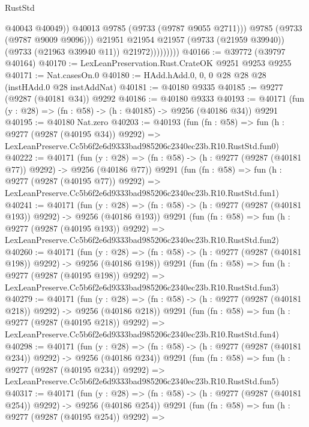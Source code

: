 \begin{lexlean}{RustStd}
\begin{coremodule}
                              @40043
                              @40049))
                          @40013
                          @9785
                          (@9733 (@9787 @9055 @2711)))
                        @9785
                        (@9733 (@9787 @9009 @9096)))
                      @21951
                      @21954
                      @21957
                      (@9733 (@21959 @39940))
                      (@9733 (@21963 @39940 @11))
                      @21972)))))))))
@40166 := @39772 (@39797 @40164)
@40170 := LexLeanPreservation.Rust.CrateOK @9251 @9253 @9255
@40171 := Nat.casesOn.{0}
@40180 := HAdd.hAdd.{0, 0, 0} @28 @28 @28 (instHAdd.{0} @28 instAddNat)
@40181 := @40180 @9335
@40185 := @9277 (@9287 (@40181 @34)) @9292
@40186 := @40180 @9333
@40193 := @40171 (fun (y : @28) => (fn : @58) -> (h : @40185) -> @9256 (@40186 @34)) @9291
@40195 := @40180 Nat.zero
@40203 := @40193
    (fun (fn : @58) =>
    fun (h : @9277 (@9287 (@40195 @34)) @9292) =>
    LexLeanPreserve.Cc5b6f2e6d9333bad985206c2340ec23b.R10.RustStd.fun0)
@40222 := @40171
    (fun (y : @28) => (fn : @58) -> (h : @9277 (@9287 (@40181 @77)) @9292) -> @9256 (@40186 @77))
    @9291
    (fun (fn : @58) =>
    fun (h : @9277 (@9287 (@40195 @77)) @9292) =>
    LexLeanPreserve.Cc5b6f2e6d9333bad985206c2340ec23b.R10.RustStd.fun1)
@40241 := @40171
    (fun (y : @28) => (fn : @58) -> (h : @9277 (@9287 (@40181 @193)) @9292) -> @9256 (@40186 @193))
    @9291
    (fun (fn : @58) =>
    fun (h : @9277 (@9287 (@40195 @193)) @9292) =>
    LexLeanPreserve.Cc5b6f2e6d9333bad985206c2340ec23b.R10.RustStd.fun2)
@40260 := @40171
    (fun (y : @28) => (fn : @58) -> (h : @9277 (@9287 (@40181 @198)) @9292) -> @9256 (@40186 @198))
    @9291
    (fun (fn : @58) =>
    fun (h : @9277 (@9287 (@40195 @198)) @9292) =>
    LexLeanPreserve.Cc5b6f2e6d9333bad985206c2340ec23b.R10.RustStd.fun3)
@40279 := @40171
    (fun (y : @28) => (fn : @58) -> (h : @9277 (@9287 (@40181 @218)) @9292) -> @9256 (@40186 @218))
    @9291
    (fun (fn : @58) =>
    fun (h : @9277 (@9287 (@40195 @218)) @9292) =>
    LexLeanPreserve.Cc5b6f2e6d9333bad985206c2340ec23b.R10.RustStd.fun4)
@40298 := @40171
    (fun (y : @28) => (fn : @58) -> (h : @9277 (@9287 (@40181 @234)) @9292) -> @9256 (@40186 @234))
    @9291
    (fun (fn : @58) =>
    fun (h : @9277 (@9287 (@40195 @234)) @9292) =>
    LexLeanPreserve.Cc5b6f2e6d9333bad985206c2340ec23b.R10.RustStd.fun5)
@40317 := @40171
    (fun (y : @28) => (fn : @58) -> (h : @9277 (@9287 (@40181 @254)) @9292) -> @9256 (@40186 @254))
    @9291
    (fun (fn : @58) =>
    fun (h : @9277 (@9287 (@40195 @254)) @9292) =>

\end{coremodule}
\end{lexlean}
